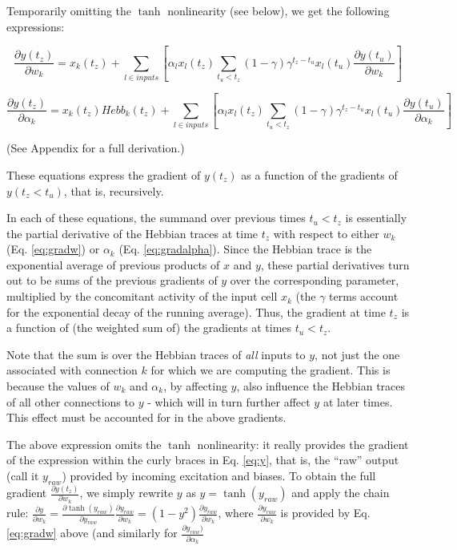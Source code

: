 \documentclass{article}
\begin{document}
Temporarily omitting the $\tanh$ nonlinearity (see below), we get the
following expressions: 

\begin{equation}
\label{eq:gradw}
\frac{\partial y(t_z)}{\partial w_k} = x_k(t_z) + \sum_{l \in inputs}[\alpha_l
x_l(t_z) \sum_{t_u<t_z}(1-\gamma) \gamma^{t_z-t_u} x_l(t_u) \frac{\partial
y(t_u)}{\partial w_k}]
\end{equation}

\begin{equation}
\label{eq:gradalpha}
\frac{\partial y(t_z)}{\partial \alpha_k} = x_k(t_z) Hebb_k(t_z) + \sum_{l \in inputs}
[\alpha_l x_l(t_z) \sum_{t_u<t_z}(1-\gamma) \gamma^{t_z-t_u} x_l(t_u) \frac{\partial
y(t_u)}{\partial \alpha_k}]
\end{equation}

(See Appendix for a full derivation.)

These equations express the gradient of $y(t_z)$ as a function of the gradients
of $y(t_z<t_u)$, that is, recursively.

In each of these equations, the summand over previous times $t_u<t_z$ is
essentially the partial derivative of the Hebbian traces at time $t_{z}$
with respect to either $w_k$ (Eq. \ref{eq:gradw}) or $\alpha_k$ (Eq.
\ref{eq:gradalpha}). Since the Hebbian trace is the exponential average of
previous products of $x$ and $y$, these partial derivatives turn out to be
sums of the previous gradients of $y$ over the corresponding parameter,
multiplied by the concomitant activity of the input cell $x_k$ (the $\gamma$ terms
account for the exponential decay of the running average). Thus, the gradient at
time $t_z$ is a function of (the weighted sum of) the gradients at times
$t_u<t_z$.

Note that the sum is over the Hebbian traces of \emph{all} inputs to $y$, not just the
one associated with connection $k$ for which we are computing the gradient. This is because the values of $w_k$ and
$\alpha_k$, by affecting $y$, also influence the Hebbian traces of all other
connections to $y$ - which will in turn further affect $y$ at later times. This effect must be accounted for in the above gradients.

The above expression omits the $\tanh$ nonlinearity: it really provides the
gradient of the expression within the curly braces in Eq. \ref{eq:y}, that is,
the ``raw'' output (call it $y_{raw}$) provided by incoming excitation and biases. To obtain
the full gradient $\frac{\partial y(t_z)}{\partial w_k}$, we simply rewrite $y$ as $y =
\tanh(y_{raw})$ and apply the chain rule: $\frac{\partial y}{\partial w_k} =
\frac{\partial \tanh(y_{raw})}{\partial y_{raw}} \frac{\partial y_{raw}}{\partial
w_k} = (1 - y^2)\frac{\partial y_{raw}}{\partial w_k}$, where $\frac{\partial
y_{raw}}{\partial w_k}$ is provided by Eq. \ref{eq:gradw} above (and similarly
for $\frac{\partial
y_{raw})}{\partial \alpha_k}$ 
\end{document}
